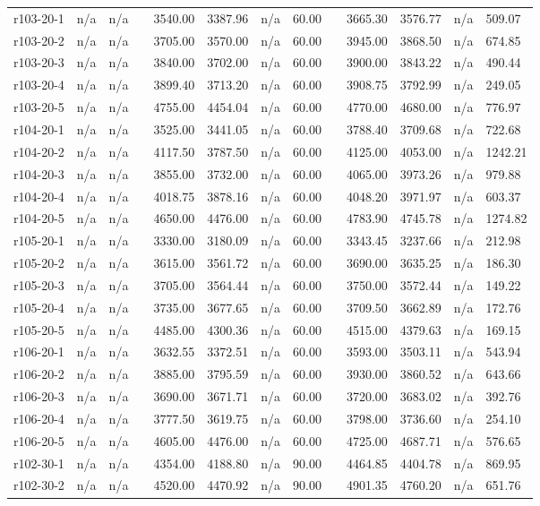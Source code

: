 \documentclass[final,5p,times,twocolumn]{elsarticle}
\begin{document}
{{{{{{{{{{{{{\begin{longtable}{l l l l l l l l l l l l l}
r103-20-1& n/a& n/a&&3540.00& 3387.96& n/a& 60.00&&3665.30& 3576.77& n/a& 509.07\\
r103-20-2& n/a& n/a&&3705.00& 3570.00& n/a& 60.00&&3945.00& 3868.50& n/a& 674.85\\
r103-20-3& n/a& n/a&&3840.00& 3702.00& n/a& 60.00&&3900.00& 3843.22& n/a& 490.44\\
r103-20-4& n/a& n/a&&3899.40& 3713.20& n/a& 60.00&&3908.75& 3792.99& n/a& 249.05\\
r103-20-5& n/a& n/a&&4755.00& 4454.04& n/a& 60.00&&4770.00& 4680.00& n/a& 776.97\\
r104-20-1& n/a& n/a&&3525.00& 3441.05& n/a& 60.00&&3788.40& 3709.68& n/a& 722.68\\
r104-20-2& n/a& n/a&&4117.50& 3787.50& n/a& 60.00&&4125.00& 4053.00& n/a& 1242.21\\
r104-20-3& n/a& n/a&&3855.00& 3732.00& n/a& 60.00&&4065.00& 3973.26& n/a& 979.88\\
r104-20-4& n/a& n/a&&4018.75& 3878.16& n/a& 60.00&&4048.20& 3971.97& n/a& 603.37\\
r104-20-5& n/a& n/a&&4650.00& 4476.00& n/a& 60.00&&4783.90& 4745.78& n/a& 1274.82\\
r105-20-1& n/a& n/a&&3330.00& 3180.09& n/a& 60.00&&3343.45& 3237.66& n/a& 212.98\\
r105-20-2& n/a& n/a&&3615.00& 3561.72& n/a& 60.00&&3690.00& 3635.25& n/a& 186.30\\
r105-20-3& n/a& n/a&&3705.00& 3564.44& n/a& 60.00&&3750.00& 3572.44& n/a& 149.22\\
r105-20-4& n/a& n/a&&3735.00& 3677.65& n/a& 60.00&&3709.50& 3662.89& n/a& 172.76\\
r105-20-5& n/a& n/a&&4485.00& 4300.36& n/a& 60.00&&4515.00& 4379.63& n/a& 169.15\\
r106-20-1& n/a& n/a&&3632.55& 3372.51& n/a& 60.00&&3593.00& 3503.11& n/a& 543.94\\
r106-20-2& n/a& n/a&&3885.00& 3795.59& n/a& 60.00&&3930.00& 3860.52& n/a& 643.66\\
r106-20-3& n/a& n/a&&3690.00& 3671.71& n/a& 60.00&&3720.00& 3683.02& n/a& 392.76\\
r106-20-4& n/a& n/a&&3777.50& 3619.75& n/a& 60.00&&3798.00& 3736.60& n/a& 254.10\\
r106-20-5& n/a& n/a&&4605.00& 4476.00& n/a& 60.00&&4725.00& 4687.71& n/a& 576.65\\
r102-30-1& n/a& n/a&&4354.00& 4188.80& n/a& 90.00&&4464.85& 4404.78& n/a& 869.95\\
r102-30-2& n/a& n/a&&4520.00& 4470.92& n/a& 90.00&&4901.35& 4760.20& n/a& 651.76\\

\end{longtable}}}}}}}}}}}}}}
\end{document}
